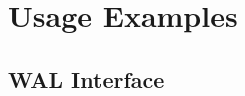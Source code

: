 \documentclass[../HDF5_RFC.tex]{subfiles}
\begin{document}
\section{Usage Examples}
\label{sec:examples}

\subsection{WAL Interface}
\label{sec:wal-interface}
\end{document}
